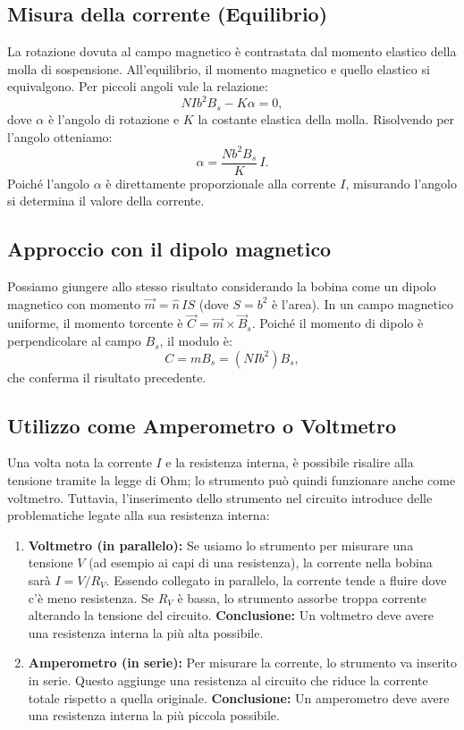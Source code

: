 \documentclass{book}
\begin{document}
\subsection*{Misura della corrente (Equilibrio)}
La rotazione dovuta al campo magnetico è contrastata dal momento elastico della molla di sospensione. All'equilibrio, il momento magnetico e quello elastico si equivalgono. Per piccoli angoli vale la relazione:
\[
N I b^2 B_s - K\alpha = 0,
\]
dove \(\alpha\) è l'angolo di rotazione e \(K\) la costante elastica della molla. Risolvendo per l'angolo otteniamo:
\[
\alpha = \frac{N b^2 B_s}{K}\,I.
\]
Poiché l'angolo \(\alpha\) è direttamente proporzionale alla corrente \(I\), misurando l'angolo si determina il valore della corrente.

\subsection*{Approccio con il dipolo magnetico}
Possiamo giungere allo stesso risultato considerando la bobina come un dipolo magnetico con momento \(\vec{m}=\hat{n}\,I S\) (dove \(S=b^2\) è l'area).
In un campo magnetico uniforme, il momento torcente è \(\vec{C}=\vec{m}\times\vec{B}_s\). Poiché il momento di dipolo è perpendicolare al campo \(B_s\), il modulo è:
\[
C = m B_s = (N I b^2) B_s,
\]
che conferma il risultato precedente.

\subsection*{Utilizzo come Amperometro o Voltmetro}
Una volta nota la corrente \(I\) e la resistenza interna, è possibile risalire alla tensione tramite la legge di Ohm; lo strumento può quindi funzionare anche come voltmetro. Tuttavia, l'inserimento dello strumento nel circuito introduce delle problematiche legate alla sua resistenza interna:

\begin{enumerate}
    \item \textbf{Voltmetro (in parallelo):} Se usiamo lo strumento per misurare una tensione \(V\) (ad esempio ai capi di una resistenza), la corrente nella bobina sarà \(I = V/R_V\). Essendo collegato in parallelo, la corrente tende a fluire dove c'è meno resistenza. Se \(R_V\) è bassa, lo strumento assorbe troppa corrente alterando la tensione del circuito.
    \textbf{Conclusione:} Un voltmetro deve avere una resistenza interna la più alta possibile.

    \item \textbf{Amperometro (in serie):} Per misurare la corrente, lo strumento va inserito in serie. Questo aggiunge una resistenza al circuito che riduce la corrente totale rispetto a quella originale.
    \textbf{Conclusione:} Un amperometro deve avere una resistenza interna la più piccola possibile.
\end{enumerate}
\end{document}
